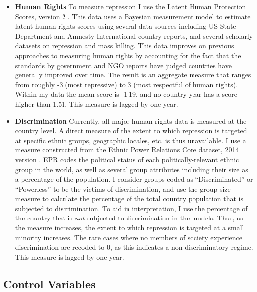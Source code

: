 \documentclass[12pt,]{book}
\providecommand{\tightlist}{%
  \setlength{\itemsep}{0pt}\setlength{\parskip}{0pt}}
\begin{document}
\begin{itemize}
\tightlist
\item
  \textbf{Human Rights} To measure repression I use the Latent Human
  Protection Scores, version 2 \citep{Fariss2014, Schnakenberg2014}.
  This data uses a Bayesian measurement model to estimate latent human
  rights scores using several data sources including US State Department
  and Amnesty International country reports, and several scholarly
  datasets on repression and mass killing. This data improves on
  previous approaches to measuring human rights by accounting for the
  fact that the standards by government and NGO reports have judged
  countries have generally improved over time. The result is an
  aggregate measure that ranges from roughly -3 (most repressive) to 3
  (most respectful of human rights). Within my data the mean score is
  -1.19, and no country year has a score higher than 1.51. This measure
  is lagged by one year.
\item
  \textbf{Discrimination} Currently, all major human rights data is
  measured at the country level. A direct measure of the extent to which
  repression is targeted at specific ethnic groups, geographic locales,
  etc. is thus unavailable. I use a measure constructed from the Ethnic
  Power Relations Core dataset, 2014 version \citep{Vogt2015}. EPR codes
  the political status of each politically-relevant ethnic group in the
  world, as well as several group attributes including their size as a
  percentage of the population. I consider groups coded as
  ``Discriminated'' or ``Powerless'' to be the victims of
  discrimination, and use the group size measure to calculate the
  percentage of the total country population that is subjected to
  discrimination. To aid in interpretation, I use the percentage of the
  country that is \emph{not} subjected to discrimination in the models.
  Thus, as the measure increases, the extent to which repression is
  targeted at a small minority increases. The rare cases where no
  members of society experience discrimination are recoded to 0, as this
  indicates a non-discriminatory regime. This measure is lagged by one
  year.
\end{itemize}

\subsection{Control Variables}\label{control-variables}
\end{document}
